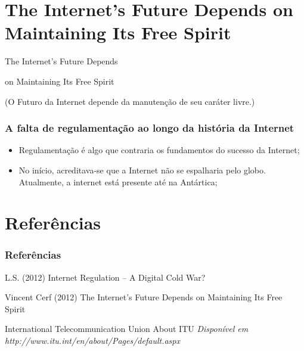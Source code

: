 \documentclass{beamer}
\begin{document}

\section{The Internet's Future Depends on Maintaining Its Free Spirit}


\begin{frame}
\huge{\centerline{The Internet's Future Depends}}
\huge{\centerline{on Maintaining Its Free Spirit}} 
\normalsize{\centerline{(O Futuro da Internet depende da manutenção de seu caráter livre.)}}
\end{frame}


\begin{frame}
\frametitle{A falta de regulamentação ao longo da história da Internet}
\begin{itemize}
\item Regulamentação é algo que contraria os fundamentos do sucesso da Internet;
\item No início, acreditava-se que a Internet não se espalharia pelo globo. Atualmente, a internet está presente até na Antártica;
\
\end{itemize}
\end{frame}

\section{Referências}

\begin{frame}
\frametitle{Referências}
\footnotesize{
\begin{thebibliography}{99} %

 L.S. (2012)
\newblock Internet Regulation -- A Digital Cold War?

 Vincent Cerf (2012)
\newblock The Internet's Future Depends on Maintaining Its Free Spirit

 International Telecommunication Union
\newblock About ITU
\newblock \emph{Disponível em http://www.itu.int/en/about/Pages/default.aspx}

\end{thebibliography}
}
\end{frame}
\end{document}
